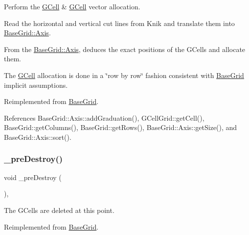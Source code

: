 Perform the \mbox{\hyperlink{classKatabatic_1_1GCell}{G\+Cell}} \& \mbox{\hyperlink{classKatabatic_1_1GCell}{G\+Cell}} vector allocation.
\begin{DoxyItemize}
\item Read the horizontal and vertical cut lines from Knik and translate them into \mbox{\hyperlink{classKatabatic_1_1BaseGrid_1_1Axis}{Base\+Grid\+::\+Axis}}.
\item From the \mbox{\hyperlink{classKatabatic_1_1BaseGrid_1_1Axis}{Base\+Grid\+::\+Axis}}, deduces the exact positions of the G\+Cells and allocate them.
\item The \mbox{\hyperlink{classKatabatic_1_1GCell}{G\+Cell}} allocation is done in a \char`\"{}row by row\char`\"{} fashion consistent with \mbox{\hyperlink{classKatabatic_1_1BaseGrid}{Base\+Grid}} implicit assumptions. 
\end{DoxyItemize}

Reimplemented from \mbox{\hyperlink{classKatabatic_1_1BaseGrid}{Base\+Grid}}.



References Base\+Grid\+::\+Axis\+::add\+Graduation(), G\+Cell\+Grid\+::get\+Cell(), Base\+Grid\+::get\+Columns(), Base\+Grid\+::get\+Rows(), Base\+Grid\+::\+Axis\+::get\+Size(), and Base\+Grid\+::\+Axis\+::sort().

\mbox{\label{classKatabatic_1_1GCellGrid_a7c13d9795eafd477994961f8a0d962d0}} 
\subsubsection{\texorpdfstring{\+\_\+pre\+Destroy()}{\_preDestroy()}}
{\footnotesize\ttfamily void \+\_\+pre\+Destroy (\begin{DoxyParamCaption}{ }\end{DoxyParamCaption})\hspace{0.3cm}{\ttfamily [protected]}, {\ttfamily [virtual]}}

The G\+Cells are deleted at this point. 

Reimplemented from \mbox{\hyperlink{classKatabatic_1_1BaseGrid}{Base\+Grid}}.

\mbox{\label{classKatabatic_1_1GCellGrid_a19a45b2e6c6b9ca8898b2fde035d1827}} 
